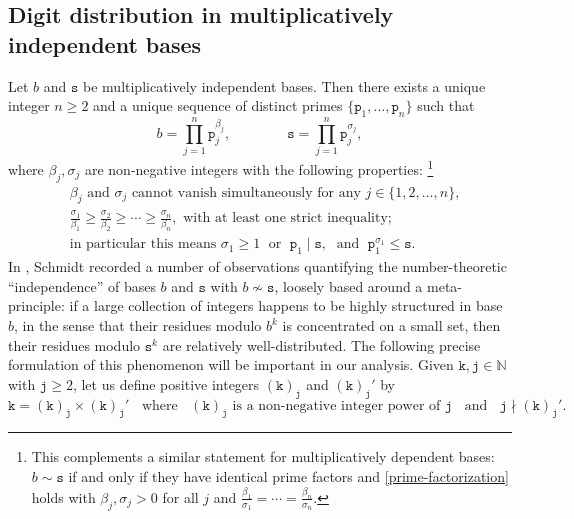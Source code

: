 \documentclass[12pt, twoside]{article}
\theoremstyle{definition}
\numberwithin{equation}{section}
\begin{document}
 \subsection{Digit distribution in multiplicatively independent bases}   
Let $b$ and $\mathtt s$ be multiplicatively independent bases. Then there exists a unique integer $n \geq 2$ and a unique sequence of distinct primes $\{\mathtt p_1, \ldots, \mathtt p_n\}$ such that 
 \begin{equation} \label{prime-factorization} 
  b = \prod_{j=1}^{n} \mathtt p_j^{\beta_j}, \qquad \qquad \mathtt s = \prod_{j=1}^{n} \mathtt p_j^{\sigma_j}, 
 \end{equation} 
 where $\beta_j, \sigma_j$ are non-negative integers with the following properties: {\footnote{This complements a similar statement for multiplicatively dependent bases: $ b \sim \mathtt s$ if and only if they have identical prime factors and  \eqref{prime-factorization} holds with $\beta_j, \sigma_j > 0$ for all $j$ and  $\frac{\beta_1}{\sigma_1} = \cdots = \frac{\beta_n}{\sigma_n}$.}} 
  \begin{align}
&\beta_j \text{ and $\sigma_j$ cannot vanish simultaneously for any $j \in \{1, 2, \ldots, n\}$}, \label{p0} \\ 
&\frac{\sigma_1}{\beta_1} \geq \frac{\sigma_2}{\beta_2} \geq \cdots \geq \frac{\sigma_n}{\beta_n}, \text{ with at least one strict inequality; } \label {p1} \\ &\text{in particular this means } \sigma_1 \geq 1 \; \text{ or } \; \mathtt p_1 \mid \mathtt s, \; \text{ and } \; \mathtt p_1^{\sigma_1} \leq \mathtt s. \label{p2}
 \end{align}
 In \cite{s60}, Schmidt recorded a number of observations quantifying the number-theoretic ``independence'' of bases $b$ and $\mathtt s$ with $b \nsim \mathtt s$, loosely based around a meta-principle: if a large collection of integers happens to be highly structured in base $b$, in the sense that their residues modulo $b^k$ is concentrated on a small set, then their residues modulo $\mathtt s^k$ are relatively well-distributed. The following precise formulation of this phenomenon will be important in our analysis.  
\vskip0.1in 
\noindent Given $\mathtt k, \mathtt j \in \mathbb N$ with $\mathtt j \geq 2$, let us define positive integers $(\mathtt k)_{\mathtt j}$ and $(\mathtt k)_{\mathtt j}'$ by 
\begin{equation} \label{factor-power-power'} 
\mathtt k = (\mathtt k)_{\mathtt j} \times (\mathtt k)_{\mathtt j}' \; \; \text{ where } \;\;  (\mathtt k)_{\mathtt j} \text{ is a non-negative integer power of } \mathtt j \; \; \text{ and } \; \; \mathtt j \nmid (\mathtt k)_{\mathtt j}'. 
\end{equation} 
\end{document}

